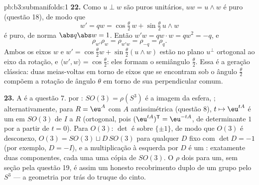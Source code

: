 \begin{solution}{pb:b3:submanifolds:1}
\textbf{22.} Como $u \perp w$ são puros unitários, $uw =
u\wedge w$ é puro (questão 18), de modo que
\[
w' = qw = \cos\tfrac\theta2\,w + \sin\tfrac\theta2\,u\wedge
w
\]
é puro, de norma $\abs q\abs w = 1$. Então $w'w = qw\cdot w
= qw^2 = -q$, e
\[
\rho_{w'}\rho_w = \rho_{w'w} = \rho_{-q} = \rho_q .
\]
Ambos os eixos $w$ e $w' = \cos\frac\theta2 w +
\sin\frac\theta2(u\wedge w)$ estão no plano $u^\perp$
ortogonal ao eixo da rotação, e $\langle w', w\rangle
= \cos\frac\theta2$: eles formam o semiângulo
$\frac\theta2$. Essa é a geração clássica: duas
meias-voltas em torno de eixos que se encontram sob o ângulo $\frac\theta2$
compõem a rotação de ângulo $\theta$ em torno de sua
perpendicular comum.

\textbf{23.} A  é a questão 7.  por :
$SO(3) = \rho(S^3)$ é a imagem  da esfera,
; alternativamente, para $R = \eu^{A}$
com $A$ antissimétrica (questão 8), $t \mapsto \eu^{tA}$
é um  em $SO(3)$ de $I$ a $R$ (ortogonal, pois
$(\eu^{tA})^{\mathsf T} = \eu^{-tA}$, de determinante $1$ por
 a partir de $t = 0$). Para $O(3)$: $\det$ é 
sobre $\{\pm1\}$, de modo que $O(3)$ é desconexo, $O(3) = SO(3)
\sqcup D\,SO(3)$ para qualquer $D$ fixo com $\det D = -1$
(por exemplo, $D = -I$), e a multiplicação à esquerda por $D$ é um
: exatamente duas componentes, cada uma uma cópia de
$SO(3)$. O $\rho$ dois para um, sem seção pela questão
19, é assim um honesto recobrimento duplo de um grupo  
pelo  $S^3$ --- a geometria por trás
do truque do cinto.


\end{solution}
